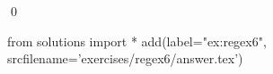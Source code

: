 
\begin{ex} 
  \label{ex:regex6}
  
  \qed
\end{ex} 
\begin{python0}
from solutions import *
add(label="ex:regex6",
    srcfilename='exercises/regex6/answer.tex') 
\end{python0}
